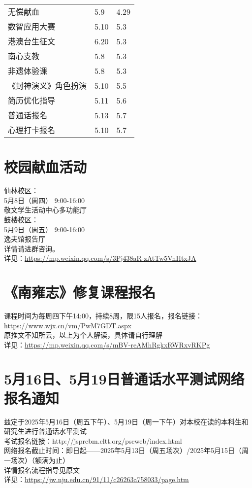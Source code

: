 \documentclass[letterpaper, 12pt]{article}
\begin{document}
\begin{multicols}{2}
{\begin{longtable}{|>{\centering\arraybackslash}m{}|m{}|m{}|}
    无偿献血 & 5.9 & 4.29\\
    数智应用大赛 & 5.10 & 5.3\\
    港澳台生征文 & 6.20 & 5.3\\
    南心支教 & 5.8 & 5.3\\
    非遗体验课 & 5.8 & 5.3\\
    《封神演义》角色扮演 & 5.10 & 5.5\\
    简历优化指导 & 5.11 & 5.6\\
    普通话报名 & 5.13 & 5.7\\
    心理打卡报名 & 5.10 & 5.7\\
    \hline
\end{longtable}
\unskip
\unpenalty
\unpenalty}\unvbox\colbbox
\end{multicols}
\begin{multicols}{2}
\pagebreak

\section{校园献血活动} %
仙林校区：
\\5月8日（周四） 9:00-16:00
\\敬文学生活动中心多功能厅
\\鼓楼校区：
\\5月9日（周五） 9:00-16:00  
\\逸夫馆报告厅
\\详情请进群咨询。
\\详见：\url{https://mp.weixin.qq.com/s/3Pj438aR-zAtTw5VnHtxJA}

\section{《南雍志》修复课程报名} %
课程时间为每周四下午14:00，持续8周，限15人报名，报名链接：https://www.wjx.cn/vm/PwM7GDT.aspx
\\原推文不知所云，以上为个人解读，具体请自行理解
\\详见：\url{https://mp.weixin.qq.com/s/mBV-reAMhRgkxRWRxvRKPg}

\section{5月16日、5月19日普通话水平测试网络报名通知} %
兹定于2025年5月16日（周五下午）、5月19日（周一下午）对本校在读的本科生和研究生进行普通话水平测试
\\考试报名链接：http://jsprebm.cltt.org/pscweb/index.html
\\网络报名截止时间：即日起——2025年5月13日（周五场次）/2025年5月15日（周一场次）（额满为止）
\\详情报名流程指导见原文
\\详见：\url{https://jw.nju.edu.cn/91/11/c26263a758033/page.htm}


\end{multicols}
\end{document}
